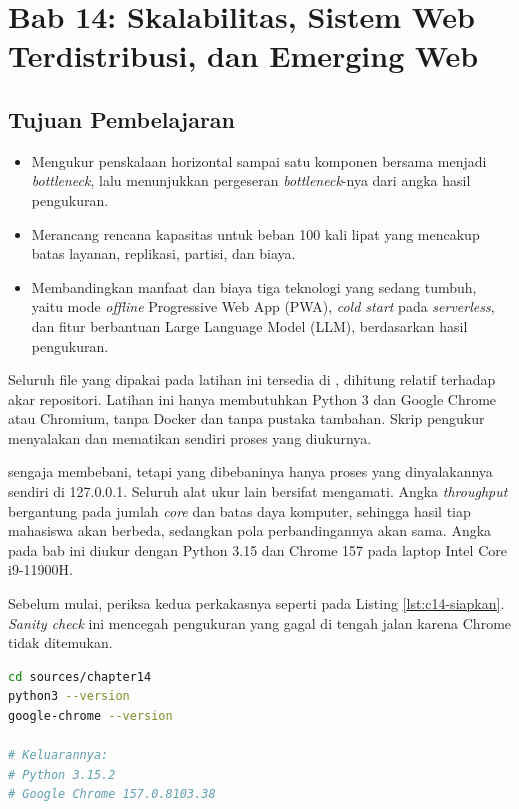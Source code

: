 \section{Bab 14: Skalabilitas, Sistem Web Terdistribusi, dan Emerging Web}

\subsection*{Tujuan Pembelajaran}
\begin{itemize}
  \item Mengukur penskalaan horizontal sampai satu komponen bersama menjadi
        \textit{bottleneck}, lalu menunjukkan pergeseran
        \textit{bottleneck}-nya dari angka hasil pengukuran.
  \item Merancang rencana kapasitas untuk beban 100 kali lipat yang mencakup
        batas layanan, replikasi, partisi, dan biaya.
  \item Membandingkan manfaat dan biaya tiga teknologi yang sedang tumbuh,
        yaitu mode \textit{offline} Progressive Web App (PWA), \textit{cold
        start} pada \textit{serverless}, dan fitur berbantuan Large Language
        Model (LLM), berdasarkan hasil pengukuran.
\end{itemize}

Seluruh file yang dipakai pada latihan ini tersedia di
, dihitung relatif terhadap akar repositori.
Latihan ini hanya membutuhkan Python 3 dan Google Chrome atau Chromium, tanpa
Docker dan tanpa pustaka tambahan. Skrip pengukur menyalakan dan mematikan
sendiri proses yang diukurnya.

 sengaja membebani, tetapi yang dibebaninya hanya
proses yang dinyalakannya sendiri di 127.0.0.1. Seluruh alat ukur lain
bersifat mengamati. Angka \textit{throughput} bergantung pada jumlah \textit{core} dan
batas daya komputer, sehingga hasil tiap mahasiswa akan berbeda,
sedangkan pola perbandingannya akan sama. Angka pada bab ini diukur dengan
Python 3.15 dan Chrome 157 pada laptop Intel Core i9-11900H.

Sebelum mulai, periksa kedua perkakasnya seperti pada Listing
\ref{lst:c14-siapkan}. \textit{Sanity check} ini mencegah pengukuran yang
gagal di tengah jalan karena Chrome tidak ditemukan.

\begin{lstlisting}[language=bash, caption={Memeriksa perkakas latihan, dijalankan dari \berkas{sources/chapter14/}}, label={lst:c14-siapkan}]
cd sources/chapter14
python3 --version
google-chrome --version

# Keluarannya:
# Python 3.15.2
# Google Chrome 157.0.8103.38
\end{lstlisting}


